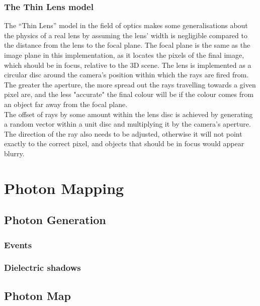 \documentclass[a4paper]{article}
\begin{document}
\subsubsection{The Thin Lens model}
The ``Thin Lens'' model in the field of optics makes some generalisations about the physics of a real lens by assuming the lens' width is negligible compared to the distance from the lens to the focal plane. The focal plane is the same as the image plane in this implementation, as it locates the pixels of the final image, which should be in focus, relative to the 3D scene. The lens is implemented as a circular disc around the camera's position within which the rays are fired from. The greater the aperture, the more spread out the rays travelling towards a given pixel are, and the less "accurate" the final colour will be if the colour comes from an object far away from the focal plane.\\

The offset of rays by some amount within the lens disc is achieved by generating a random vector within a unit disc and multiplying it by the camera's aperture. The direction of the ray also needs to be adjusted, otherwise it will not point exactly to the correct pixel, and objects that should be in focus would appear blurry.

\section{Photon Mapping}
\cite{Jensen1996photonmaps}
\subsection{Photon Generation}

\subsubsection{Events}

\subsubsection{Dielectric shadows}

\subsection{Photon Map}
\end{document}
